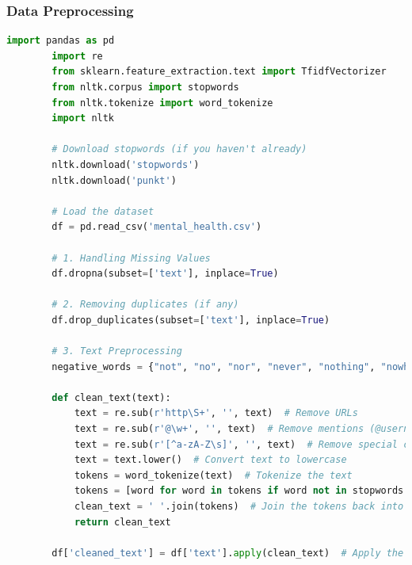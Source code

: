     \subsubsection{Data Preprocessing}

    \begin{tcolorbox}[colback=gray!5!white, colframe=gray!80!black, boxrule=0.5pt, title=Text Preprocessing]
        \begin{lstlisting}[language=Python]
        import pandas as pd
        import re
        from sklearn.feature_extraction.text import TfidfVectorizer
        from nltk.corpus import stopwords
        from nltk.tokenize import word_tokenize
        import nltk
    
        # Download stopwords (if you haven't already)
        nltk.download('stopwords')
        nltk.download('punkt')
    
        # Load the dataset
        df = pd.read_csv('mental_health.csv')
    
        # 1. Handling Missing Values
        df.dropna(subset=['text'], inplace=True)
    
        # 2. Removing duplicates (if any)
        df.drop_duplicates(subset=['text'], inplace=True)
    
        # 3. Text Preprocessing
        negative_words = {"not", "no", "nor", "never", "nothing", "nowhere", "neither", "cannot", "n't", "without", "barely", "hardly", "scarcely"}
    
        def clean_text(text):
            text = re.sub(r'http\S+', '', text)  # Remove URLs
            text = re.sub(r'@\w+', '', text)  # Remove mentions (@username)
            text = re.sub(r'[^a-zA-Z\s]', '', text)  # Remove special characters, numbers, and punctuations
            text = text.lower()  # Convert text to lowercase
            tokens = word_tokenize(text)  # Tokenize the text
            tokens = [word for word in tokens if word not in stopwords.words('english') or word in negative_words]  # Remove stopwords, but keep negative words
            clean_text = ' '.join(tokens)  # Join the tokens back into a single string
            return clean_text
    
        df['cleaned_text'] = df['text'].apply(clean_text)  # Apply the cleaning function to the 'text' column
    
    \end{lstlisting}
    \end{tcolorbox}


